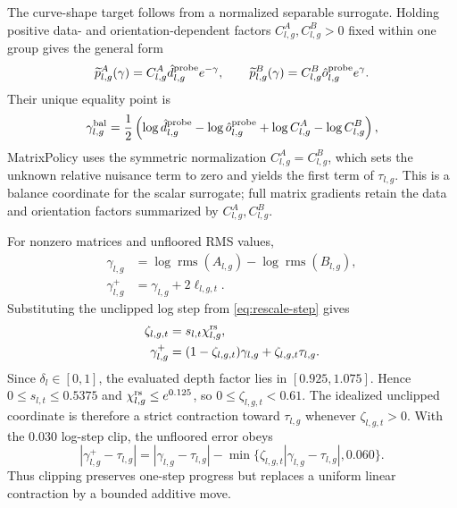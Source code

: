 \documentclass{article}
\newcommand{\rms}{\operatorname{rms}}
\begin{document}
The curve-shape target follows from a normalized separable surrogate.  Holding
positive data- and orientation-dependent factors
$C^A_{l,g},C^B_{l,g}>0$ fixed within one group gives the general form
\begin{equation}
    \widetilde p^A_{l,g}(\gamma)
    =
    C^A_{l,g}\hat d^{\rm probe}_{l,g}e^{-\gamma},
    \qquad
    \widetilde p^B_{l,g}(\gamma)
    =
    C^B_{l,g}\hat o^{\rm probe}_{l,g}e^{\gamma}.
\end{equation}
Their unique equality point is
\begin{equation}
    \gamma^{\rm bal}_{l,g}
    =
    \frac{1}{2}
    \left(
    \log\hat d^{\rm probe}_{l,g}
    -
    \log\hat o^{\rm probe}_{l,g}
    +
    \log C^A_{l,g}
    -
    \log C^B_{l,g}
    \right),
    \label{eq:appendix-gamma-star}
\end{equation}
MatrixPolicy uses the symmetric normalization $C^A_{l,g}=C^B_{l,g}$, which sets
the unknown relative nuisance term to zero and yields the first term of
$\tau_{l,g}$.  This is a balance coordinate for the scalar surrogate; full
matrix gradients retain the data and orientation factors summarized by
$C^A_{l,g},C^B_{l,g}$.

For nonzero matrices and unfloored RMS values,
\begin{equation}
\begin{aligned}
    \gamma_{l,g}
    &=
    \log\rms(A_{l,g})-\log\rms(B_{l,g}),
    \\
    \gamma_{l,g}^{+}
    &=
    \gamma_{l,g}+2\ell_{l,g,t}.
\end{aligned}
    \label{eq:appendix-gamma-shift}
\end{equation}
Substituting the unclipped log step from \eqref{eq:rescale-step} gives
\begin{equation}
\begin{aligned}
    \zeta_{l,g,t}
    &=
    s_{l,t}\chi^{\rm rs}_{l,g},
    \\
    \gamma_{l,g}^{+}
    &=
    (1-\zeta_{l,g,t})\gamma_{l,g}
    +\zeta_{l,g,t}\tau_{l,g}.
\end{aligned}
    \label{eq:appendix-rescale-contraction}
\end{equation}
Since $\delta_l\in[0,1]$, the evaluated depth factor lies in
$[0.925,1.075]$.  Hence $0\le s_{l,t}\le0.5375$ and
$\chi^{\rm rs}_{l,g}\le e^{0.125}$, so
$0\le\zeta_{l,g,t}<0.61$.  The idealized unclipped coordinate is therefore a
strict contraction toward $\tau_{l,g}$ whenever $\zeta_{l,g,t}>0$.  With the
$0.030$ log-step clip, the unfloored error obeys
\begin{equation}
    |\gamma^+_{l,g}-\tau_{l,g}|
    =
    |\gamma_{l,g}-\tau_{l,g}|
    -
    \min\{\zeta_{l,g,t}|\gamma_{l,g}-\tau_{l,g}|,0.060\}.
    \label{eq:appendix-clipped-gamma-progress}
\end{equation}
Thus clipping preserves one-step progress but replaces a uniform linear
contraction by a bounded additive move.
\end{document}
